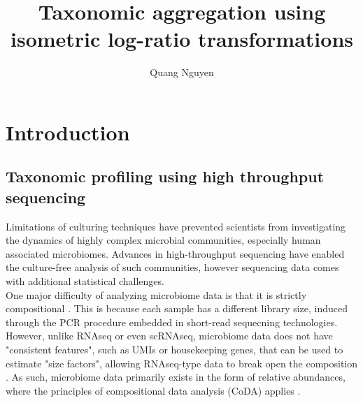 \documentclass{article}
\title{Taxonomic aggregation using isometric log-ratio transformations}
\author{Quang Nguyen}
\begin{document}
\maketitle

\section{Introduction}
\subsection{Taxonomic profiling using high throughput sequencing}
 Limitations of culturing techniques have prevented scientists from investigating the dynamics of highly complex microbial communities, especially human associated microbiomes. Advances in high-throughput sequencing have enabled the culture-free analysis of such communities, however sequencing data comes with additional statistical challenges. \\
 One major difficulty of analyzing microbiome data is that it is strictly compositional \cite{gloor2017}. This is because each sample has a different library size, induced through the PCR procedure embedded in short-read sequecning technologies. However, unlike RNAseq or even scRNAseq, microbiome data does not have "consistent features", such as UMIs or housekeeping genes, that can be used to estimate "size factors", allowing RNAseq-type data to break open the composition \cite{quinn2018}. As such, microbiome data primarily exists in the form of relative abundances, where the principles of compositional data analysis (CoDA) applies \cite{aitchison}. 
\end{document}
